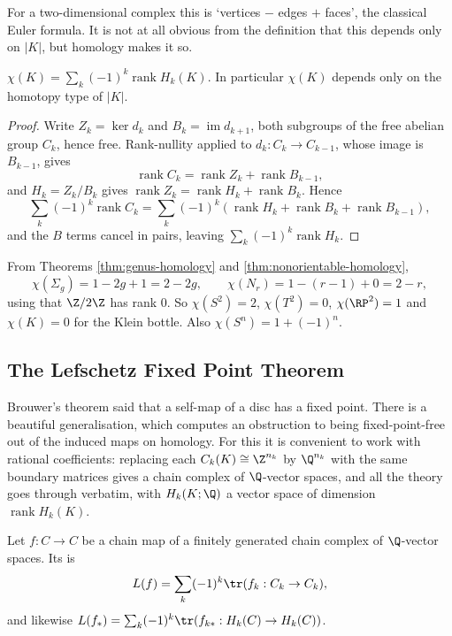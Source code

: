 For a two-dimensional complex this is `vertices $-$ edges $+$ faces', the classical Euler
formula. It is not at all obvious from the definition that this depends only on $|K|$,
but homology makes it so.

\begin{theorem} \label{at-thm:euler}
	$\displaystyle \chi(K) = \sum_k(-1)^k\operatorname{rank}H_k(K)$. In particular $\chi(K)$ depends only on the homotopy type of $|K|$.
\end{theorem}
\begin{proof}
	Write $Z_k = \ker d_k$ and $B_k = \operatorname{im}d_{k+1}$, both subgroups of the free abelian group $C_k$, hence free. Rank-nullity applied to $d_k: C_k \to C_{k-1}$, whose image is $B_{k-1}$, gives
	$$
	\operatorname{rank}C_k = \operatorname{rank}Z_k + \operatorname{rank}B_{k-1},
	$$
	and $H_k = Z_k/B_k$ gives $\operatorname{rank}Z_k = \operatorname{rank}H_k + \operatorname{rank}B_k$. Hence
	$$
	\sum_k(-1)^k\operatorname{rank}C_k = \sum_k(-1)^k(\operatorname{rank}H_k + \operatorname{rank}B_k + \operatorname{rank}B_{k-1}),
	$$
	and the $B$ terms cancel in pairs, leaving $\sum_k(-1)^k\operatorname{rank}H_k$.
\end{proof}

\begin{example}
	From Theorems \ref{thm:genus-homology} and \ref{thm:nonorientable-homology},
	$$
	\chi(\Sigma_g) = 1 - 2g + 1 = 2-2g, \qquad \chi(N_r) = 1 - (r-1) + 0 = 2 - r,
	$$
	using that $\Z/2\Z$ has rank $0$. So $\chi(S^2) = 2$, $\chi(T^2) = 0$, $\chi(\RP^2) = 1$ and $\chi(K) = 0$ for the Klein bottle. Also $\chi(S^n) = 1+(-1)^n$.
\end{example}

\subsection{The Lefschetz Fixed Point Theorem}

Brouwer's theorem said that a self-map of a disc has a fixed point. There is a beautiful
generalisation, which computes an obstruction to being fixed-point-free out of the
induced maps on homology. For this it is convenient to work with rational coefficients:
replacing each $C_k(K) \cong \Z^{n_k}$ by $\Q^{n_k}$ with the same boundary matrices gives
a chain complex of $\Q$-vector spaces, and all the theory goes through verbatim, with
$H_k(K;\Q)$ a vector space of dimension $\operatorname{rank}H_k(K)$.

\begin{definition}
	Let $f: C \to C$ be a chain map of a finitely generated chain complex of $\Q$-vector spaces. Its  is
	$$
	L(f) = \sum_k (-1)^k \tr(f_k: C_k \to C_k),
	$$
	and likewise $L(f_*) = \sum_k(-1)^k\tr(f_{k*}: H_k(C)\to H_k(C))$.
\end{definition}

